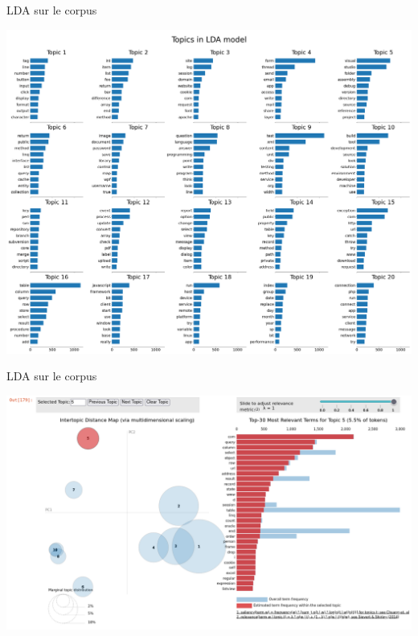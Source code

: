\documentclass[10pt]{beamer}
\begin{document}
\begin{frame}{LDA sur le corpus}
    \begin{center}
       \includegraphics[width=0.9\linewidth]{figures/coprus_LDA_small_topics.png}
    \end{center}
\end{frame}
\begin{frame}{LDA sur le corpus}
    \begin{center}
       \includegraphics[width=\linewidth]{illustrations/pyLDAviz_topic5_web.png}
    \end{center}
\end{frame}
\end{document}
